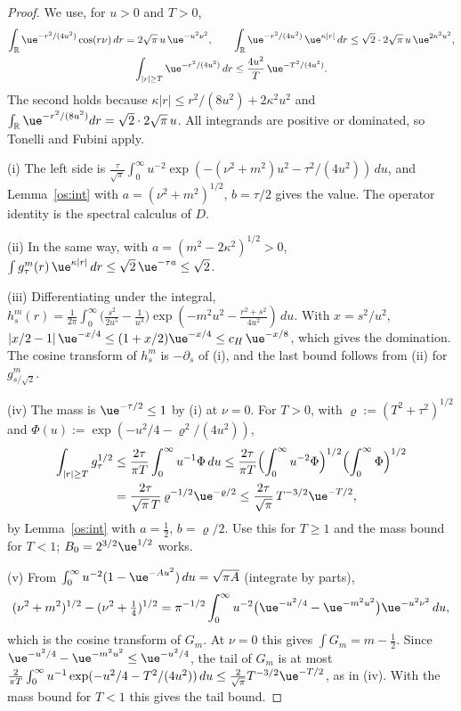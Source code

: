 \begin{proof}
We use, for $u>0$ and $T>0$,
\begin{gather*}
\int_{\mathbb R}\ue^{-r^2/(4u^2)}\cos(r\nu)\,dr=2\sqrt\pi\,u\,\ue^{-u^2\nu^2},\qquad
\int_{\mathbb R}\ue^{-r^2/(4u^2)}\,\ue^{\kappa|r|}\,dr\le\sqrt2\cdot2\sqrt\pi\,u\,\ue^{2\kappa^2u^2},\\
\int_{|r|\ge T}\ue^{-r^2/(4u^2)}\,dr\le\frac{4u^2}{T}\,\ue^{-T^2/(4u^2)} .
\end{gather*}
The second holds because $\kappa|r|\le r^2/(8u^2)+2\kappa^2u^2$ and $\int_{\mathbb R}\ue^{-r^2/(8u^2)}dr=\sqrt2\cdot2\sqrt\pi\,u$.
All integrands are positive or dominated, so Tonelli and Fubini apply.

(i) The left side is $\frac{\tau}{\sqrt\pi}\int_0^\infty u^{-2}\exp(-(\nu^2+m^2)u^2-\tau^2/(4u^2))\,du$, and Lemma~\ref{os:int} with
$a=(\nu^2+m^2)^{1/2}$, $b=\tau/2$ gives the value. The operator identity is the spectral calculus of $D$.

(ii) In the same way, with $a=(m^2-2\kappa^2)^{1/2}>0$, $\int g^m_\tau(r)\,\ue^{\kappa|r|}\,dr\le\sqrt2\,\ue^{-\tau a}\le\sqrt2$.

(iii) Differentiating under the integral,
$h^m_s(r)=\frac1{2\pi}\int_0^\infty\bigl(\frac{s^2}{2u^5}-\frac1{u^3}\bigr)\exp(-m^2u^2-\frac{r^2+s^2}{4u^2})\,du$. With $x=s^2/u^2$,
$|x/2-1|\,\ue^{-x/4}\le(1+x/2)\ue^{-x/4}\le c_H\,\ue^{-x/8}$, which gives the domination. The cosine transform of $h^m_s$ is $-\partial_s$ of
(i), and the last bound follows from (ii) for $g^m_{s/\sqrt2}$.

(iv) The mass is $\ue^{-\tau/2}\le1$ by (i) at $\nu=0$. For $T>0$, with $\varrho:=(T^2+\tau^2)^{1/2}$ and
$\Phi(u):=\exp(-u^2/4-\varrho^2/(4u^2))$,
\begin{align*}
\int_{|r|\ge T}g^{1/2}_\tau&\le\frac{2\tau}{\pi T}\int_0^\infty u^{-1}\Phi\,du\le\frac{2\tau}{\pi T}\Bigl(\int_0^\infty u^{-2}\Phi\Bigr)^{1/2}\Bigl(\int_0^\infty\Phi\Bigr)^{1/2}\\
&=\frac{2\tau}{\sqrt\pi\,T}\,\varrho^{-1/2}\ue^{-\varrho/2}\le\frac{2\tau}{\sqrt\pi}\,T^{-3/2}\ue^{-T/2},
\end{align*}
by Lemma~\ref{os:int} with $a=\tfrac12$, $b=\varrho/2$. Use this for $T\ge1$ and the mass bound for $T<1$; $B_0=2^{3/2}\ue^{1/2}$ works.

(v) From $\int_0^\infty u^{-2}(1-\ue^{-Au^2})\,du=\sqrt{\pi A}$ (integrate by parts),
\[
(\nu^2+m^2)^{1/2}-(\nu^2+\tfrac14)^{1/2}=\pi^{-1/2}\int_0^\infty u^{-2}\bigl(\ue^{-u^2/4}-\ue^{-m^2u^2}\bigr)\ue^{-u^2\nu^2}\,du,
\]
which is the cosine transform of $G_m$. At $\nu=0$ this gives $\int G_m=m-\tfrac12$. Since $\ue^{-u^2/4}-\ue^{-m^2u^2}\le\ue^{-u^2/4}$, the tail of
$G_m$ is at most $\frac{2}{\pi T}\int_0^\infty u^{-1}\exp(-u^2/4-T^2/(4u^2))\,du\le\frac2{\sqrt\pi}T^{-3/2}\ue^{-T/2}$, as in (iv). With the mass
bound for $T<1$ this gives the tail bound.
\end{proof}


